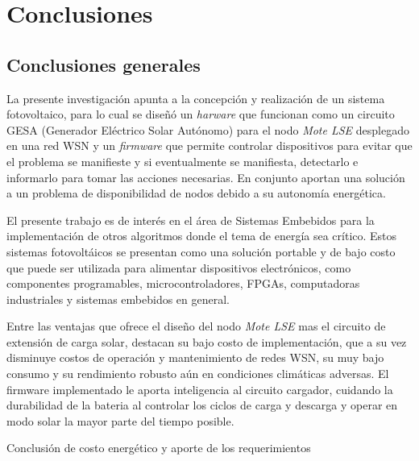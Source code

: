 
\chapter{Conclusiones} %

\label{Chapter5} %

\section{Conclusiones generales}

La presente investigación apunta a la concepción y realización de un sistema fotovoltaico, para lo cual se diseñó un \textit{harware} que funcionan como un circuito GESA (Generador Eléctrico Solar Autónomo) para el nodo \textit{Mote LSE} desplegado en una red WSN y un \textit{firmware} que permite controlar dispositivos para evitar que el problema se manifieste y si eventualmente se manifiesta, detectarlo e informarlo para tomar las acciones necesarias. En conjunto aportan una solución a un problema de disponibilidad de nodos debido a su autonomía energética.

El presente trabajo es de interés en el área de Sistemas Embebidos para la implementación de otros algoritmos donde el tema de energía sea crítico. Estos sistemas fotovoltáicos se presentan como una solución portable y de bajo costo que puede ser utilizada para alimentar dispositivos electrónicos, como componentes programables, microcontroladores, FPGAs, computadoras industriales y sistemas embebidos en general.

Entre las ventajas que ofrece el diseño del nodo \textit{Mote LSE} mas el circuito de extensión de carga solar, destacan su bajo costo de implementación, que a su vez disminuye costos de operación y mantenimiento de redes WSN, su muy bajo consumo y su rendimiento robusto aún en condiciones climáticas adversas. El firmware implementado le aporta inteligencia al circuito cargador, cuidando la durabilidad de la bateria al controlar los ciclos de carga y descarga y operar en modo solar la mayor parte del tiempo posible.

Conclusión de costo energético y aporte de los requerimientos

